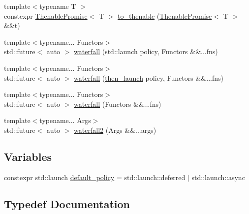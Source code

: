 \begin{DoxyCompactItemize}
\item 
{\footnotesize template$<$typename T $>$ }\\constexpr \hyperlink{classthenable_1_1_thenable_promise}{Thenable\+Promise}$<$ T $>$ \hyperlink{namespacethenable_a5053e8ddbc047a3030ab818ce04982aa}{to\+\_\+thenable} (\hyperlink{classthenable_1_1_thenable_promise}{Thenable\+Promise}$<$ T $>$ \&\&t)
\item 
{\footnotesize template$<$typename... Functors$>$ }\\std\+::future$<$ auto $>$ \hyperlink{namespacethenable_a33c6172954453b975c9f4ae67e0a0aa3}{waterfall} (std\+::launch policy, Functors \&\&...fns)
\item 
{\footnotesize template$<$typename... Functors$>$ }\\std\+::future$<$ auto $>$ \hyperlink{namespacethenable_ad94b01ba5d7ac4f724c024c6508d9d4e}{waterfall} (\hyperlink{namespacethenable_adf31291b806157ad914943dae5b3c94e}{then\+\_\+launch} policy, Functors \&\&...fns)
\item 
{\footnotesize template$<$typename... Functors$>$ }\\std\+::future$<$ auto $>$ \hyperlink{namespacethenable_a66dca065a7fa161e3ca68d43e1bac85a}{waterfall} (Functors \&\&...fns)
\item 
{\footnotesize template$<$typename... Args$>$ }\\std\+::future$<$ auto $>$ \hyperlink{namespacethenable_a12edde6863ab12b3c9d3c4e47a6e4136}{waterfall2} (Args \&\&...args)
\end{DoxyCompactItemize}
\subsection*{Variables}
\begin{DoxyCompactItemize}
\item 
constexpr std\+::launch \hyperlink{namespacethenable_a55a20a452e9ba9c0eff946d9b8636f06}{default\+\_\+policy} = std\+::launch\+::deferred $\vert$ std\+::launch\+::async
\end{DoxyCompactItemize}


\subsection{Typedef Documentation}
